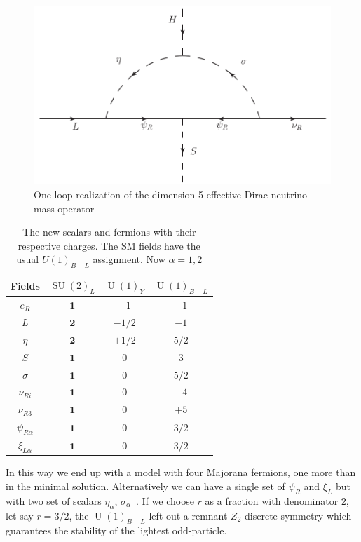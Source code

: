 \documentclass[12pt]{article}
\begin{document}
\begin{figure}
\centering
\includegraphics[scale=0.75]{Neutrino2.pdf}
\caption{One-loop realization of the dimension-5 effective Dirac neutrino mass operator }
\label{fig:ld5}
\end{figure}
%

\begin{table}
  \centering
  \begin{tabular}{|c|c|c|c|}
    \hline  
    Fields     & $\operatorname{SU}(2)_L$ & $\operatorname{U}(1)_Y $ & $\operatorname{U}(1)_{B-L}$ \\ \hline
    $e_R $  & $\boldsymbol{1}$& $-1$  &  $-1$ \\
     $L $  & $\boldsymbol{2}$& $-1/2$  &  $-1$ \\
    $\eta$  & $\boldsymbol{2}$ & $+1/2$  & $5/2$ \\
    $S$ & $\boldsymbol{1}$ & $0$  & $3$ \\
    $\sigma$ & $\boldsymbol{1}$ & $0$ & $5/2$ \\
    \hline
     $\nu_{Ri}$ & $\boldsymbol{1}$ & $0$ & $-4$\\
    $\nu_{R3}$ & $\boldsymbol{1}$ & $0$ & $+5$\\
    $\psi_{R\alpha}$  & $\boldsymbol{1}$ & $0$ & $3/2$ \\\hline
    $\xi_{L\alpha}$  & $\boldsymbol{1}$ & $0$ & $3/2$ \\\hline
  \end{tabular}
  \caption{The new scalars and fermions with their respective charges. The SM fields have the usual $U(1)_{B-L}$ assignment. Now $\alpha=1,2$}
    \label{tab:partcont2}
\end{table}

In this way we end up with a model with four Majorana fermions, one more than in the minimal solution. Alternatively we can have a single set of $\psi_R$ and $\xi_L$ but with two set of scalars $\eta_\alpha$, $\sigma_{\alpha}$~\cite{Reig:2018mdk}. If we choose $r$ as a fraction with denominator $2$, let say $r=3/2$, the $\operatorname{U}(1)_{B-L}$ left out a remnant $Z_2$ discrete symmetry which guarantees the stability of the lightest odd-particle.
\end{document}
